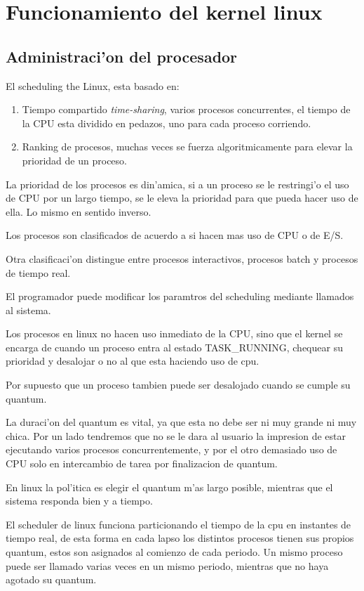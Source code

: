\section{Funcionamiento del kernel linux}
\subsection{Administraci'on del procesador}
El scheduling the Linux, esta basado en:
\begin{enumerate}
\item Tiempo compartido \textit{time-sharing}, varios procesos concurrentes, el tiempo de la CPU esta dividido en pedazos, uno para cada proceso corriendo.
\item Ranking de procesos, muchas veces se fuerza algoritmicamente para elevar la prioridad de un proceso.
\end{enumerate}
La prioridad de los procesos es din'amica, si a un proceso se le restringi'o el uso de CPU por un largo tiempo, se le eleva la prioridad para que pueda hacer uso de ella. Lo mismo en sentido inverso.

Los procesos son clasificados de acuerdo a si hacen mas uso de CPU o de E/S.

Otra clasificaci'on distingue entre procesos interactivos, procesos batch y procesos de tiempo real.

El programador puede modificar los paramtros del scheduling mediante llamados al sistema.

Los procesos en linux no hacen uso inmediato de la CPU, sino que el kernel se encarga de cuando un proceso entra al estado TASK\_RUNNING, chequear su prioridad y desalojar o no al que esta haciendo uso de cpu.

Por supuesto que un proceso tambien puede ser desalojado cuando se cumple su quantum.

La duraci'on del quantum es vital, ya que esta no debe ser ni muy grande ni muy chica. Por un lado tendremos que no se le dara al usuario la impresion de estar ejecutando varios procesos concurrentemente, y por el otro demasiado uso de CPU solo en intercambio de tarea por finalizacion de quantum.

En linux la pol'itica es elegir el quantum m'as largo posible, mientras que el sistema responda bien y a tiempo.

El scheduler de linux funciona particionando el tiempo de la cpu en instantes de tiempo real, de esta forma en cada lapso los distintos procesos tienen sus propios quantum, estos son asignados al comienzo de cada periodo. Un mismo proceso puede ser llamado varias veces en un mismo periodo, mientras que no haya agotado su quantum.

